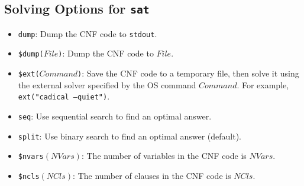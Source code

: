 \subsection{Solving Options for \texttt{sat}}
\begin{itemize}
\item \texttt{dump}: Dump the CNF code to \texttt{stdout}.
\item \texttt{\$dump($File$)}: Dump the CNF code to $File$.
\item \texttt{\$ext($Command$)}:  Save the CNF code to a temporary file, then solve it using the external solver specified by the OS command $Command$. For example, \texttt{ext("cadical --quiet")}.
\item \texttt{seq}: Use sequential search to find an optimal answer.
\item \texttt{split}: Use binary search to find an optimal answer (default).
\item \texttt{\$nvars$(NVars)$}: The number of variables in the CNF code is $NVars$.
\item \texttt{\$ncls$(NCls)$}: The number of clauses in the CNF code is $NCls$.
\end{itemize}

